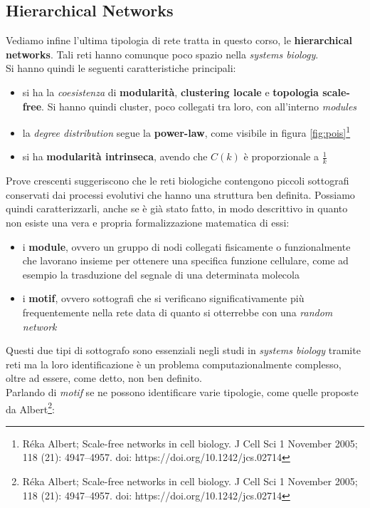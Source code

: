 \documentclass[a4paper,12pt, oneside]{book}
\begin{document}
\subsection{Hierarchical Networks}
Vediamo infine l'ultima tipologia di rete tratta in questo corso, le
\textbf{hierarchical networks}. Tali reti hanno comunque poco spazio nella
\textit{systems biology}.\\
Si hanno quindi le seguenti caratteristiche principali:
\begin{itemize}
  \item si ha la \textit{coesistenza} di \textbf{modularità}, \textbf{clustering
    locale} e \textbf{topologia scale-free}. Si hanno quindi cluster, poco
  collegati tra loro, con all'interno \textit{modules}
  \item la \textit{degree distribution} segue la \textbf{power-law}, come
  visibile in figura \ref{fig:pois}\footnote{Réka Albert; Scale-free 
    networks in cell biology. J Cell Sci 1 November 2005; 118 (21):
    4947–4957. doi: https://doi.org/10.1242/jcs.02714}
  \item si ha \textbf{modularità intrinseca}, avendo che $C(k)$ è proporzionale
  a $\frac{1}{k}$
\end{itemize}
Prove crescenti suggeriscono che le reti biologiche contengono piccoli
sottografi conservati dai processi evolutivi che hanno una struttura ben
definita. Possiamo quindi caratterizzarli, anche se è già stato fatto, in modo
descrittivo in quanto non esiste una vera e propria formalizzazione matematica
di essi: 
\begin{itemize}
  \item i \textbf{module}, ovvero un gruppo di nodi collegati fisicamente o
  funzionalmente che lavorano insieme per ottenere una specifica funzione
  cellulare, come ad esempio la trasduzione del segnale di una determinata
  molecola 
  \item i \textbf{motif}, ovvero sottografi che si verificano significativamente
  più frequentemente nella rete data di quanto si otterrebbe con una
  \textit{random network}
\end{itemize}
Questi due tipi di sottografo sono essenziali negli studi in \textit{systems
  biology} tramite reti ma la loro identificazione è un problema
computazionalmente complesso, oltre ad essere, come detto, non ben definito. \\
Parlando di \textit{motif} se ne possono identificare varie tipologie, come
quelle proposte da Albert\footnote{Réka Albert; Scale-free networks in cell
  biology. J Cell Sci 1 November 2005; 118 (21): 4947–4957. doi:
  https://doi.org/10.1242/jcs.02714}:
\end{document}
